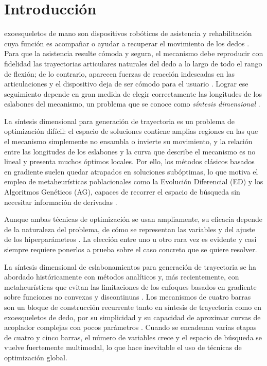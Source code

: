 \section{Introducción}
 exoesqueletos de mano son dispositivos robóticos de asistencia y
rehabilitación cuya función es acompañar o ayudar a recuperar el movimiento de
los dedos \cite{ref_exo_review}. Para que la asistencia resulte cómoda y segura,
el mecanismo debe reproducir con fidelidad las trayectorias articulares naturales
del dedo a lo largo de todo el rango de flexión; de lo contrario, aparecen
fuerzas de reacción indeseadas en las articulaciones y el dispositivo deja de ser
cómodo para el usuario \cite{ref_fourbar_nat}. Lograr ese seguimiento depende en
gran medida de elegir correctamente las longitudes de los eslabones del
mecanismo, un problema que se conoce como \emph{síntesis dimensional}
\cite{ref_de_fourbar}.

La síntesis dimensional para generación de trayectoria es un problema de
optimización difícil: el espacio de soluciones contiene amplias regiones en las
que el mecanismo simplemente no ensambla o invierte su movimiento, y la relación
entre las longitudes de los eslabones y la curva que describe el mecanismo es no
lineal y presenta muchos óptimos locales. Por ello, los métodos clásicos basados
en gradiente suelen quedar atrapados en soluciones subóptimas, lo que motiva el
empleo de metaheurísticas poblacionales como la Evolución Diferencial (ED) y los
Algoritmos Genéticos (AG), capaces de recorrer el espacio de búsqueda sin
necesitar información de derivadas \cite{ref_de_fourbar,ref_tlbo}.

Aunque ambas técnicas de optimización se usan ampliamente, su eficacia depende de la naturaleza del problema, de cómo se representan
las variables y del ajuste de los hiperparámetros
\cite{ref_ga_pso_de,ref_de_vs_ga}. La elección entre uno u otro rara vez es
evidente y casi siempre requiere ponerlos a prueba sobre el caso concreto que se
quiere resolver.

La síntesis dimensional de eslabonamientos para generación de trayectoria se ha
abordado históricamente con métodos analíticos y, más recientemente, con
metaheurísticas que evitan las limitaciones de los enfoques basados en gradiente
sobre funciones no convexas y discontinuas \cite{ref_de_fourbar,ref_tlbo}. Los
mecanismos de cuatro barras son un bloque de construcción recurrente tanto en
síntesis de trayectoria como en exoesqueletos de dedo, por su simplicidad y su
capacidad de aproximar curvas de acoplador complejas con pocos parámetros
\cite{ref_fourbar_nat,ref_exo_stephenson}. Cuando se encadenan varias etapas de
cuatro y cinco barras, el número de variables crece y el espacio de búsqueda se
vuelve fuertemente multimodal, lo que hace inevitable el uso de técnicas de
optimización global.

